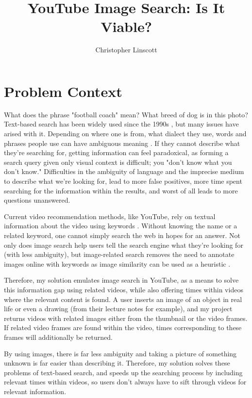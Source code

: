 \documentclass[10pt,twocolumn]{article}
\title{YouTube Image Search: Is It Viable?}
\author{Christopher Linscott}
\affiliation{Occidental College}
\begin{document}
\maketitle


\section{Problem Context}

What does the phrase "football coach" mean? What breed of dog is in this photo? Text-based search has been widely used since the 1990s \cite{WIKIPEDIA FULL TODO IN CNN}, but many issues have arised with it. Depending on where one is from, what dialect they use, words and phrases people use can have ambiguous meaning \cite{Beall2008}. If they cannot describe what they're searching for, getting information can feel paradoxical, as forming a search query given only visual context is difficult; you "don't know what you don't know." Difficulties in the ambiguity of language and the imprecise medium to describe what we're looking for, lead to more false positives, more time spent searching for the information within the results, and worst of all leads to more questions unanswered.

Current video recommendation methods, like YouTube, rely on textual information about the video using keywords \cite{Stanford2021}. Without knowing the name or a related keyword, one cannot simply search the web in hopes for an answer. Not only does image search help users tell the search engine what they’re looking for (with less ambiguity), but image-related search removes the need to annotate images online with keywords as image similarity can be used as a heuristic \cite{Adrakatti2016}.

Therefore, my solution emulates image search in YouTube, as a means to solve this information gap using related videos, while also offering times within videos where the relevant content is found. A user inserts an image of an object in real life or even a drawing (from their lecture notes for example), and my project returns videos with related images either from the thumbnail or the video frames. If related video frames are found within the video, times corresponding to these frames will additionally be returned.

By using images, there is far less ambiguity and taking a picture of something unknown is far easier than describing it. Therefore, my solution solves these problems of text-based search, and speeds up the searching process by including relevant times within videos, so users don't always have to sift through videos for relevant information.
\end{document}

